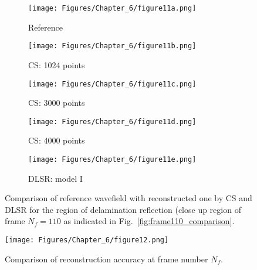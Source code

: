 \begin{figure} [h!]
	\centering
	\begin{subfigure}[b]{0.32\textwidth}
		\centering
		\texttt{[image: Figures/Chapter\_6/figure11a.png]}
		\caption{Reference}
		\label{fig:frame110delam_ref}
	\end{subfigure}
	\hfill
	\begin{subfigure}[b]{0.32\textwidth}
		\centering
		\texttt{[image: Figures/Chapter\_6/figure11b.png]}
		\caption{CS: 1024 points}
		\label{fig:frame110delam_CS1024}
	\end{subfigure}
	\hfill
	\begin{subfigure}[b]{0.32\textwidth}
		\centering
		\texttt{[image: Figures/Chapter\_6/figure11c.png]}
		\caption{CS: 3000 points}
		\label{fig:frame110delam_CS3000}
	\end{subfigure}	
	\hfill
	\begin{subfigure}[b]{0.32\textwidth}
		\centering
		\texttt{[image: Figures/Chapter\_6/figure11d.png]}
		\caption{CS: 4000 points}
		\label{fig:frame110delam_CS4000}
	\end{subfigure}
	\begin{subfigure}[b]{0.32\textwidth}
		\centering
		\texttt{[image: Figures/Chapter\_6/figure11e.png]}
		\caption{DLSR: model I}
		\label{fig:frame110delam_Abdalraheem}
	\end{subfigure}
	\caption{Comparison of reference wavefield with reconstructed one by CS and DLSR for the region of delamination reflection (close up region of frame $N_f = 110$ as indicated in Fig.~\ref{fig:frame110_comparison}.}
	\label{fig:frame110del_comparison}
\end{figure} 
\clearpage
\begin{figure} [h!]
	\centering
	\texttt{[image: Figures/Chapter\_6/figure12.png]}
	\caption{Comparison of reconstruction accuracy at frame number $N_f$.}
	\label{fig:frame_metrics}
\end{figure}

